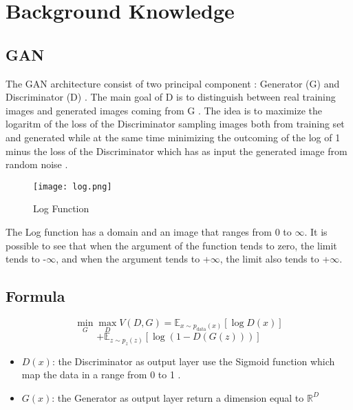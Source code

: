 
\section*{Background Knowledge}

\subsection*{
    GAN
}
The GAN architecture consist of two principal component :
Generator (G) and Discriminator (D) .
The main goal of D is to distinguish between real training images and generated images coming 
from G .
The idea is to maximize the logaritm of the loss of the Discriminator sampling images both from training set and 
generated while at the same time minimizing the outcoming of the log of 1 minus the loss of the Discriminator which has 
as input the generated image from random noise .


\begin{figure}[h!]
\texttt{[image: log.png]}
\caption{Log Function}
\end{figure}
The Log function has a domain and an image that ranges from 0 to $\infty$.
It is possible to see that when the argument of the function tends to zero, the limit tends to -$\infty$, 
and when the argument tends to +$\infty$, the limit also tends to +$\infty$.

\subsection*{Formula}
\begin{equation}
    \min_{G} \max_{D} V(D, G) = \mathbb{E}_{x \sim p_{\text{data}}(x)}[\log D(x)] 
\end{equation}
\[
+ \mathbb{E}_{z \sim p_z(z)}[\log(1 - D(G(z)))]
\]
\begin{itemize}
    \item $D(x)$: the Discriminator as output layer use the Sigmoid function which map the data in a
    range from 0 to 1 .
    \item $G(x)$: the Generator as output layer return a dimension equal to $\mathbb{R}^D$
\end{itemize}

